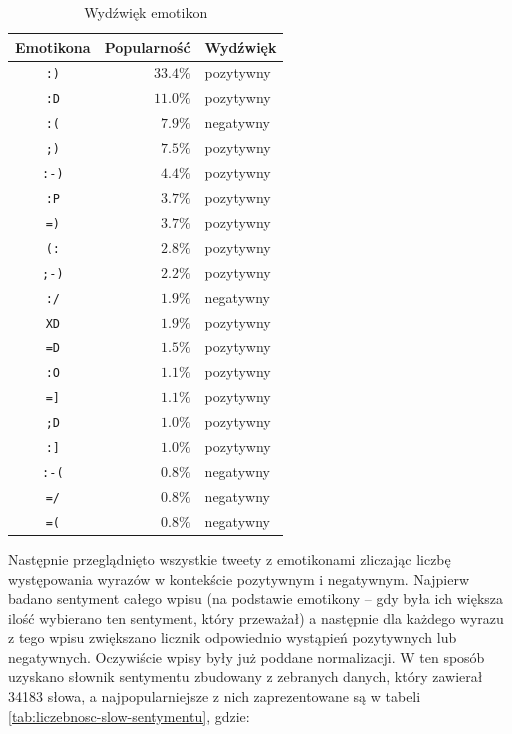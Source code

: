 \begin{table}[ht!]  
\begin{center}  
\begin{tabular}{|c|r|l|}
\hline
Emotikona & Popularność & Wydźwięk
\\ \hline
\texttt{:)} & $33.4\%$ & pozytywny \\ \hline
\texttt{:D} & $11.0\%$ & pozytywny \\ \hline
\texttt{:(} & $7.9\%$ & negatywny \\ \hline
\texttt{;)} & $7.5\%$ & pozytywny \\ \hline
\texttt{:-)} & $4.4\%$ & pozytywny \\ \hline
\texttt{:P} & $3.7\%$ & pozytywny \\ \hline
\texttt{=)} & $3.7\%$ & pozytywny \\ \hline
\texttt{(:} & $2.8\%$ & pozytywny \\ \hline
\texttt{;-)} & $2.2\%$ & pozytywny \\ \hline
\texttt{:/} & $1.9\%$ & negatywny \\ \hline
\texttt{XD} & $1.9\%$ & pozytywny \\ \hline
\texttt{=D} & $1.5\%$ & pozytywny \\ \hline
\texttt{:O} & $1.1\%$ & pozytywny \\ \hline
\texttt{=]} & $1.1\%$ & pozytywny \\ \hline
\texttt{;D} & $1.0\%$ & pozytywny \\ \hline
\texttt{:]} & $1.0\%$ & pozytywny \\ \hline
\texttt{:-(} & $0.8\%$ & negatywny \\ \hline
\texttt{=/} & $0.8\%$ & negatywny \\ \hline
\texttt{=(} & $0.8\%$ & negatywny \\ \hline
\end{tabular} 
\end{center} 
\caption{Wydźwięk emotikon}
\label{tab:wydzwiek-emotikon}
\end{table}

Następnie przeglądnięto wszystkie tweety z emotikonami zliczając liczbę
występowania wyrazów w kontekście pozytywnym i negatywnym.
Najpierw badano sentyment całego wpisu (na podstawie emotikony -- gdy była ich
większa ilość wybierano ten sentyment, który przeważał) a następnie dla każdego
wyrazu z tego wpisu zwiększano licznik odpowiednio wystąpień pozytywnych lub
negatywnych. Oczywiście wpisy były już poddane normalizacji.
W ten sposób uzyskano słownik sentymentu zbudowany z zebranych danych, który
zawierał 34183 słowa, a najpopularniejsze z nich zaprezentowane są w tabeli
\ref{tab:liczebnosc-slow-sentymentu}, gdzie:

